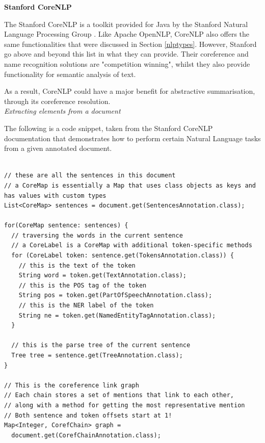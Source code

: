 \documentclass[12pt]{article}
\begin{document}
\textbf{Stanford CoreNLP}

The Stanford CoreNLP \cite{corenlp} is a toolkit provided for Java by the Stanford Natural Language Processing Group \cite{stanford}. Like Apache OpenNLP, CoreNLP also offers the same functionalities that were discussed in Section \ref{nlptypes}. However, Stanford go above and beyond this list in what they can provide. Their coreference and name recognition solutions are "competition winning", whilst they also provide functionality for semantic analysis of text.

As a result, CoreNLP could have a major benefit for abstractive summarisation, through its coreference resolution. \\

\emph{Extracting elements from a document}

The following is a code snippet, taken from the Stanford CoreNLP documentation that demonstrates how to perform certain Natural Language tasks from a given annotated document. \\

\begin{lstlisting}[style=MyJava, firstnumber=1, caption={Analysing an annotated document using Stanford's CoreNLP},captionpos=b]

// these are all the sentences in this document
// a CoreMap is essentially a Map that uses class objects as keys and has values with custom types
List<CoreMap> sentences = document.get(SentencesAnnotation.class);

for(CoreMap sentence: sentences) {
  // traversing the words in the current sentence
  // a CoreLabel is a CoreMap with additional token-specific methods
  for (CoreLabel token: sentence.get(TokensAnnotation.class)) {
    // this is the text of the token
    String word = token.get(TextAnnotation.class);
    // this is the POS tag of the token
    String pos = token.get(PartOfSpeechAnnotation.class);
    // this is the NER label of the token
    String ne = token.get(NamedEntityTagAnnotation.class);
  }

  // this is the parse tree of the current sentence
  Tree tree = sentence.get(TreeAnnotation.class);
}

// This is the coreference link graph
// Each chain stores a set of mentions that link to each other,
// along with a method for getting the most representative mention
// Both sentence and token offsets start at 1!
Map<Integer, CorefChain> graph = 
  document.get(CorefChainAnnotation.class); 
 
\end{lstlisting}
\end{document}
